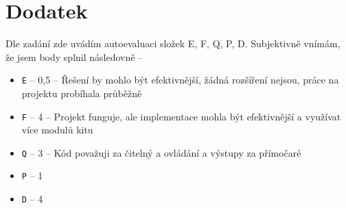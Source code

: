 \documentclass[14pt]{extarticle}
\begin{document}
    \newpage
    \section*{Dodatek}
    Dle zadání zde uvádím autoevaluaci složek E, F, Q, P, D.
    Subjektivně vnímám, že jsem body splnil následovně -- 
    \begin{itemize}
    \setlength\itemsep{0,5pt}
    \item \texttt{E} -- 0,5 -- Řešení by mohlo být efektivnější, žádná rozšíření nejsou, práce na projektu probíhala průběžně
    \item \texttt{F} -- 4 -- Projekt funguje, ale implementace mohla být efektivnější a využívat více modulů kitu
    \item \texttt{Q} -- 3 -- Kód považuji za čitelný a ovládání a výstupy za přímočaré
    \item \texttt{P} -- 1 
    \item \texttt{D} -- 4
    \end{itemize}
    
    \newpage
    
    \renewcommand{\refname}{Literatura}
    
\end{document}
